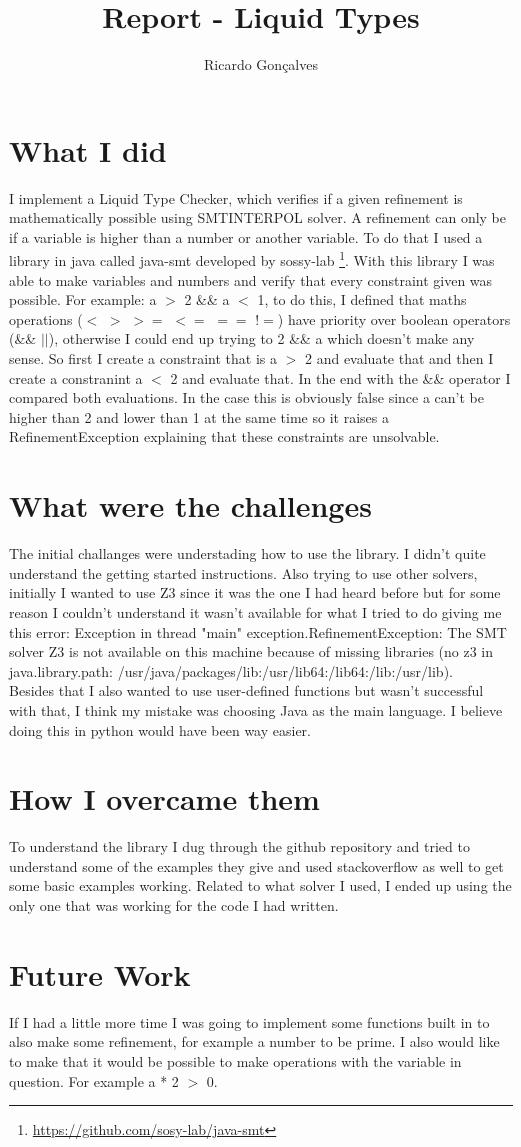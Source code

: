 \documentclass[a4paper, 12pt]{article}
\author{Ricardo Gonçalves}
\title{Report - Liquid Types}
\date{}
\begin{document}
\maketitle

\section{What I did}
I implement a Liquid Type Checker, which verifies if a given refinement is mathematically possible using SMTINTERPOL solver. A refinement can only be if a variable is higher than a number or another variable. To do that I used a library in java called java-smt developed by sossy-lab \footnote{\url{https://github.com/sosy-lab/java-smt}}. With this library I was able to make variables and numbers and verify that every constraint given was possible. For example: a $>$ 2 \&\& a $<$ 1, to do this, I defined that maths operations ($<$ $>$ $>=$ $<=$ $==$ $!=$) have priority over boolean operators (\&\& $||$), otherwise I could end up trying to 2 \&\& a which doesn't make any sense. So first I create a constraint that is a $>$ 2 and evaluate that and then I create a constranint a $<$ 2 and evaluate that. In the end with the \&\& operator I compared both evaluations. In the case this is obviously false since a can't be higher than 2 and lower than 1 at the same time so it raises a RefinementException explaining that these constraints are unsolvable.

\section{What were the challenges}
The initial challanges were understading how to use the library. I didn't quite understand the getting started instructions. Also trying to use other solvers, initially I wanted to use Z3 since it was the one I had heard before but for some reason I couldn't understand it wasn't available for what I tried to do giving me this error: Exception in thread "main" exception.RefinementException: The SMT solver Z3 is not available on this machine because of missing libraries (no z3 in java.library.path: /usr/java/packages/lib:/usr/lib64:/lib64:/lib:/usr/lib).\\ 
Besides that I also wanted to use user-defined functions but wasn't successful with that, I think my mistake was choosing Java as the main language. I believe doing this in python would have been way easier.

\section{How I overcame them}
To understand the library I dug through the github repository and tried to understand some of the examples they give and used stackoverflow as well to get some basic examples working. Related to what solver I used, I ended up using the only one that was working for the code I had written.
\section{Future Work}
If I had a little more time I was going to implement some functions built in to also make some refinement, for example a number to be prime. I also would like to make that it would be possible to make operations with the variable in question. For example a * 2 $>$ 0.
\end{document}

